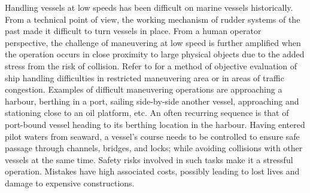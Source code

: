 
Handling vessels at low speeds has been difficult on marine vessels historically. From a technical point of view, the working mechanism of rudder systems of the past made it difficult to turn vessels in place. From a human operator perspective, the challenge of maneuvering at low speed is further amplified when the operation occurs in close proximity to large physical objects due to the added stress from the risk of collision. Refer to \citep{inoue2000evaluation} for a method of objective evaluation of ship handling difficulties in restricted maneuvering area or in areas of traffic congestion. Examples of difficult maneuvering operations are approaching a harbour, berthing in a port, sailing side-by-side another vessel, approaching and stationing close to an oil platform, etc. An often recurring sequence is that of  port-bound vessel heading to its berthing location in the harbour. Having entered pilot waters from seaward, a vessel's course needs to be controlled to ensure safe passage through channels, bridges, and locks; while avoiding collisions with other vessels at the same time. Safety risks involved in such tasks make it a stressful operation. Mistakes have high associated costs, possibly leading to lost lives and damage to expensive constructions.




